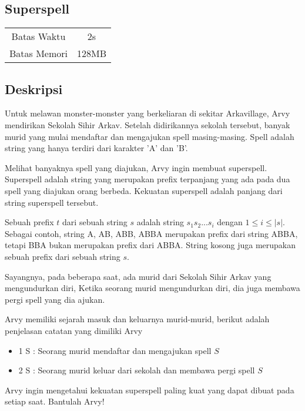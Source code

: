 \documentclass{article}
\begin{document}
\begin{center}
    \section*{Superspell} %

    \begin{tabular}{ | c c | }
        \hline
        Batas Waktu  & 2s \\    %
        Batas Memori & 128MB \\  %
        \hline
    \end{tabular}
\end{center}

\subsection*{Deskripsi}
Untuk melawan monster-monster yang berkeliaran di sekitar Arkavillage, Arvy mendirikan Sekolah Sihir Arkav. Setelah didirikannya sekolah tersebut, banyak murid yang mulai mendaftar dan mengajukan spell masing-masing. Spell adalah string yang hanya terdiri dari karakter 'A' dan 'B'.

Melihat banyaknya spell yang diajukan, Arvy ingin membuat superspell. Superspell adalah string yang merupakan prefix terpanjang yang ada pada dua spell yang diajukan orang berbeda. Kekuatan superspell adalah panjang dari string superspell tersebut.

Sebuah prefix $t$ dari sebuah string $s$ adalah string $s_1s_2...s_i$ dengan $1 \leq i \leq |s|$. Sebagai contoh, string A, AB, ABB, ABBA merupakan prefix dari string ABBA, tetapi BBA bukan merupakan prefix dari ABBA. String kosong juga merupakan sebuah prefix dari sebuah string $s$.

Sayangnya, pada beberapa saat, ada murid dari Sekolah Sihir Arkav yang mengundurkan diri, Ketika seorang murid mengundurkan diri, dia juga membawa pergi spell yang dia ajukan.

Arvy memiliki sejarah masuk dan keluarnya murid-murid, berikut adalah penjelasan catatan yang dimiliki Arvy
\begin{itemize}
	\item1 S : Seorang murid mendaftar dan mengajukan spell $S$
	\item2 S : Seorang murid keluar dari sekolah dan membawa pergi spell $S$
\end{itemize}
Arvy ingin mengetahui kekuatan superspell paling kuat yang dapat dibuat pada setiap saat. Bantulah Arvy!
\end{document}
